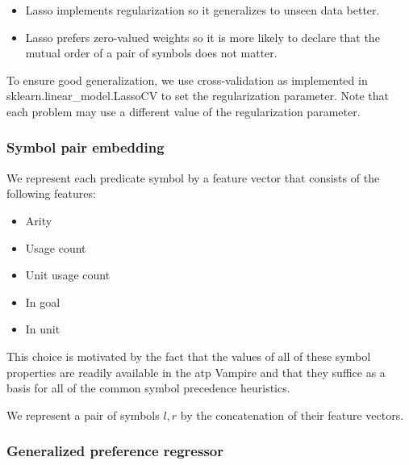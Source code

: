 \begin{itemize}
	\item Lasso implements regularization so it generalizes to unseen data better.
	\item Lasso prefers zero-valued weights so it is more likely to declare that the mutual order of a pair of symbols does not matter.
\end{itemize}

To ensure good generalization,
we use cross-validation as implemented in sklearn.linear\_model.LassoCV \cite{?}
to set the regularization parameter.
Note that each problem may use a different value of the regularization parameter.

\subsubsection{Symbol pair embedding}

We represent each predicate symbol by a feature vector that consists of the following features:

\begin{itemize}
	\item Arity
	\item Usage count
	\item Unit usage count
	\item In goal
	\item In unit
\end{itemize}

This choice is motivated by the fact that the values of all of these symbol properties
are readily available in the \gls{atp} Vampire
and that they suffice as a basis for all of the common symbol precedence heuristics.

We represent a pair of symbols \(l, r\) by the concatenation of their feature vectors.

\subsubsection{Generalized preference regressor}

